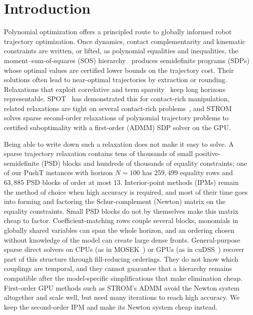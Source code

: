 \section{Introduction}\label{sec:intro}

Polynomial optimization offers a principled route to globally informed robot
trajectory optimization. Once dynamics, contact complementarity and kinematic
constraints are written, or lifted, as polynomial equalities and inequalities,
the moment--sum-of-squares (SOS) hierarchy~\cite{lasserre2001global,parrilo2003semidefinite}
produces semidefinite programs (SDPs) whose optimal values are certified lower
bounds on the trajectory cost. Their solutions often lead to near-optimal
trajectories by extraction or rounding. Relaxations that exploit correlative and
term sparsity~\cite{waki2006sums,lasserre2006convergent,wang2021tssos,wang2022cstssos}
keep long horizons representable. SPOT~\cite{kang2025spot} has demonstrated this
for contact-rich manipulation, related relaxations are tight on several
contact-rich problems~\cite{graesdal2024tight}, and STROM~\cite{kang2024strom}
solves sparse second-order relaxations of polynomial trajectory problems to
certified suboptimality with a first-order (ADMM) SDP solver on the GPU.

Being able to write down such a relaxation does not make it easy to solve.
A sparse trajectory relaxation contains tens of thousands of small
positive-semidefinite (PSD) blocks and hundreds of thousands of equality
constraints; one of our PushT instances with horizon $N=100$ has $259{,}499$
equality rows and $63{,}885$ PSD blocks of order at most $13$. Interior-point
methods (IPMs) remain the method of choice when high accuracy is required, and
most of their time goes into forming and factoring the Schur-complement (Newton)
matrix on the equality constraints. Small PSD blocks do not by themselves make
this matrix cheap to factor. Coefficient-matching rows couple several blocks,
monomials in globally shared variables can span the whole horizon, and an
ordering chosen without knowledge of the model can create large dense fronts.
General-purpose sparse direct solvers on CPUs (as in MOSEK~\cite{mosek}) or GPUs
(as in cuDSS~\cite{cudss}) recover part of this structure through fill-reducing
orderings. They do not know which couplings are temporal, and they cannot
guarantee that a hierarchy remains compatible after the model-specific
simplifications that make elimination cheap. First-order GPU methods such as
STROM's ADMM avoid the Newton system altogether and scale well, but need many
iterations to reach high accuracy. We keep the second-order IPM and make its
Newton system cheap instead.


